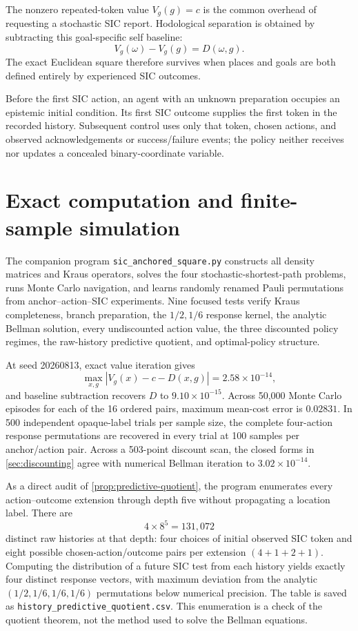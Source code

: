 \documentclass[11pt]{article}
\theoremstyle{definition}
\theoremstyle{remark}
\begin{document}
The nonzero repeated-token value \(V_g(g)=c\) is the common overhead of requesting a
stochastic SIC report. Hodological separation is obtained by subtracting this
goal-specific self baseline:
\begin{equation}
 V_g(\omega)-V_g(g)=D(\omega,g).
 \label{eq:baseline-subtraction}
\end{equation}
The exact Euclidean square therefore survives when places and goals are both
defined entirely by experienced SIC outcomes.

Before the first SIC action, an agent with an unknown preparation occupies an
epistemic initial condition. Its first SIC outcome supplies the first token in
the recorded history. Subsequent control uses only that token, chosen actions,
and observed acknowledgements or success/failure events; the policy neither
receives nor updates a concealed binary-coordinate variable.

\section{Exact computation and finite-sample simulation}

The companion program \texttt{sic\_anchored\_square.py} constructs all density
matrices and Kraus operators, solves the four stochastic-shortest-path
problems, runs Monte Carlo navigation, and learns randomly renamed Pauli
permutations from anchor--action--SIC experiments. Nine focused tests verify
Kraus completeness, branch preparation, the \(1/2,1/6\) response kernel, the
analytic Bellman solution, every undiscounted action value, the three
discounted policy regimes, the raw-history predictive quotient, and
optimal-policy structure.

At seed 20260813, exact value iteration gives
\[
 \max_{x,g}|V_g(x)-c-D(x,g)|=2.58\times10^{-14},
\]
and baseline subtraction recovers \(D\) to \(9.10\times10^{-15}\). Across
50,000 Monte Carlo episodes for each of the 16 ordered pairs, maximum mean-cost
error is \(0.02831\). In 500 independent opaque-label trials per sample size,
the complete four-action response permutations are recovered in every trial
at 100 samples per anchor/action pair. Across a 503-point discount scan, the
closed forms in \cref{sec:discounting} agree with numerical Bellman iteration
to \(3.02\times10^{-14}\).

As a direct audit of \cref{prop:predictive-quotient}, the program enumerates
every action--outcome extension through depth five without propagating a
location label.  There are
\[
 4\times 8^5=131{,}072
\]
distinct raw histories at that depth: four choices of initial observed SIC
token and eight possible chosen-action/outcome pairs per extension
\((4+1+2+1)\).  Computing the distribution of a future SIC test from each
history yields exactly four distinct response vectors, with maximum deviation
from the analytic \((1/2,1/6,1/6,1/6)\) permutations below numerical
precision.  The table is saved as
\texttt{history\_predictive\_quotient.csv}.  This enumeration is a check of
the quotient theorem, not the method used to solve the Bellman equations.
\end{document}
